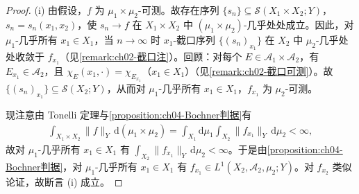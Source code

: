 \documentclass[../../main.tex]{subfiles}%
\begin{document}
\begin{proof}
(i) 由假设，$f$ 为 $\mu_1\times\mu_2$-可测。故存在序列 $\{s_n\}\subseteq\mathcal{S}(X_1\times X_2;Y)$，$s_n=s_n(x_1,x_2)$，使 $s_n\to f$ 在 $X_1\times X_2$ 中 $(\mu_1\times\mu_2)$-几乎处处成立。因此，对 $\mu_1$-几乎所有 $x_1\in X_1$，当 $n\to\infty$ 时 $x_1$-截口序列 $\{(s_n)_{x_1}\}$ 在 $X_2$ 中 $\mu_2$-几乎处处收敛于 $f_{x_1}$（见\cref{remark:ch02-截口注}）。回顾：对每个 $E\in\mathcal{A}_1\times\mathcal{A}_2$，有 $E_{x_1}\in\mathcal{A}_2$，且 $\chi_E(x_1,\cdot)=\chi_{E_{x_1}}$（$x_1\in X_1$）（见\cref{remark:ch02-截口可测}）。故 $\{(s_n)_{x_1}\}\subseteq\mathcal{S}(X_2;Y)$，从而对 $\mu_1$-几乎所有 $x_1\in X_1$，$f_{x_1}$ 为 $\mu_2$-可测。

现注意由 Tonelli 定理与\cref{proposition:ch04-Bochner判据}有
\begin{align*}
\int_{X_1\times X_2}\|f\|_Y\,\mathrm{d}(\mu_1\times\mu_2)=\int_{X_1}\mathrm{d}\mu_1\int_{X_2}\|f_{x_1}\|_Y\,\mathrm{d}\mu_2<\infty,
\end{align*}
故对 $\mu_1$-几乎所有 $x_1\in X_1$ 有 $\int_{X_2}\|f_{x_1}\|_Y\,\mathrm{d}\mu_2<\infty$。于是由\cref{proposition:ch04-Bochner判据}，对 $\mu_1$-几乎所有 $x_1\in X_1$ 有 $f_{x_1}\in L^1(X_2,\mathcal{A}_2,\mu_2;Y)$。对 $f_{x_2}$ 类似论证，故断言 (i) 成立。


\end{proof}
\end{document}
